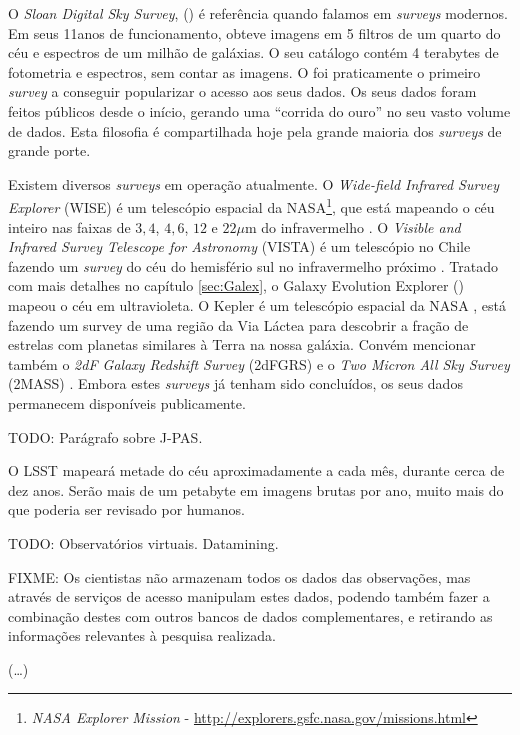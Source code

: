 O {\em Sloan Digital Sky Survey}, (\SDSS) \citep{York2000} é referência quando
falamos em {\em surveys} modernos. Em seus 11\fixme anos de funcionamento,
obteve imagens em 5 filtros de um quarto do céu e espectros de um milhão de
galáxias. O seu catálogo contém 4 terabytes de fotometria e espectros, sem
contar as imagens. O \SDSS foi praticamente o primeiro {\em survey} a conseguir
popularizar o acesso aos seus dados. Os seus dados foram feitos públicos desde o
início\citneed, gerando uma ``corrida do ouro'' no seu vasto volume de dados.
Esta filosofia é compartilhada hoje pela grande maioria dos {\em surveys} de
grande porte.

Existem diversos {\em surveys} em operação atualmente. O {\em Wide-field
Infrared Survey Explorer} (WISE) é um telescópio espacial da NASA\footnote{{\em
NASA Explorer Mission} - \url{http://explorers.gsfc.nasa.gov/missions.html}},
que está mapeando o céu inteiro nas faixas de $3,4$, $4,6$, $12$ e $22\mu$m do
infravermelho \citep{Wright2010}. O {\em Visible and Infrared Survey Telescope
for Astronomy} (VISTA) é um telescópio no Chile fazendo um {\em survey} do céu
do hemisfério sul no infravermelho próximo \citep{Born2010}. Tratado com mais
detalhes no capítulo \ref{sec:Galex}, o {Galaxy Evolution Explorer} (\galex)
mapeou o céu em ultravioleta. O Kepler é um telescópio espacial da NASA
\citep{Borucki2010}, está fazendo um survey de uma região da Via Láctea para
descobrir a fração de estrelas com planetas similares à Terra na nossa galáxia.
Convém mencionar também o {\em 2dF Galaxy Redshift Survey} (2dFGRS)
\citep{Colless1999} e o {\em Two Micron All Sky Survey} (2MASS)
\citep{Skrutskie2006}. Embora estes {\em surveys} já tenham sido concluídos, os
seus dados permanecem disponíveis publicamente.

TODO: Parágrafo sobre J-PAS.

O LSST mapeará metade do céu aproximadamente a cada mês, durante cerca de dez
anos. Serão mais de um petabyte em imagens brutas por ano, muito mais do que
poderia ser revisado por humanos.

TODO: Observatórios virtuais. Datamining.

FIXME: Os cientistas não armazenam todos os dados das observações, mas através
de serviços de acesso manipulam estes dados, podendo também fazer a combinação
destes com outros bancos de dados complementares, e retirando as informações
relevantes à pesquisa realizada.

(\ldots)

